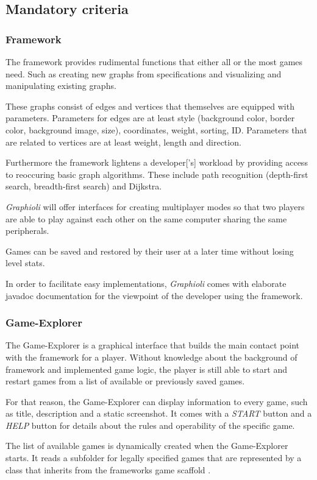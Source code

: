\subsection{Mandatory criteria}
\subsubsection{Framework}
The framework provides rudimental functions that either all or the most games need. Such as creating new graphs from specifications and visualizing and manipulating existing graphs.\par
These graphs consist of \glspl{edge} and \glspl{vertice} that themselves are equipped with parameters. Parameters for edges are at least style (background color, border color, background image, size), coordinates, weight, sorting, \gls{ID}. Parameters that are related to vertices are at least weight, length and direction.\par
Furthermore the framework lightens a \gls{developer}['s] workload by providing access to reoccuring basic graph algorithms. These include path recognition (depth-first search, breadth-first search) and Dijkstra.\par {}
\emph{Graphioli} will offer interfaces for creating multiplayer modes so that two \glspl{player} are able to play against each other on the same computer sharing the same peripherals.\par
Games can be saved and restored by their user at a later time without losing \gls{level} stats.\par
In order to facilitate easy implementations, \emph{Graphioli} comes with elaborate \Gls{javadoc} documentation for the viewpoint of the developer using the framework.\par {}

\subsubsection{Game-Explorer}
The Game-Explorer is a graphical interface that builds the main contact point with the framework for a player. Without knowledge about the background of framework and implemented game logic, the player is still able to start and restart games from a list of available or previously saved games.\par
For that reason, the Game-Explorer can display information to every game, such as title, description and a static screenshot. It comes with a \emph{START} button  and a \emph{HELP} button for details about the rules and operability of the specific game.\par
The list of available games is dynamically created when the Game-Explorer starts. It reads a subfolder for legally specified games that are represented by a class that inherits from the frameworks game scaffold .


